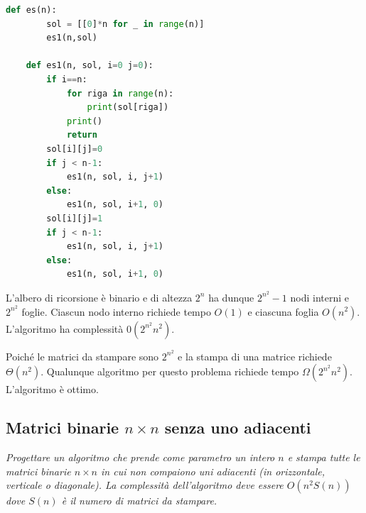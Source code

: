 \begin{lstlisting}[language=Python]
    def es(n):
        sol = [[0]*n for _ in range(n)]
        es1(n,sol)

    def es1(n, sol, i=0 j=0):
        if i==n:
            for riga in range(n):
                print(sol[riga])
            print()
            return
        sol[i][j]=0
        if j < n-1: 
            es1(n, sol, i, j+1)
        else: 
            es1(n, sol, i+1, 0)
        sol[i][j]=1
        if j < n-1:
            es1(n, sol, i, j+1)
        else:
            es1(n, sol, i+1, 0)
\end{lstlisting}
L'albero di ricorsione è binario e di altezza $2^n$ ha dunque $2^{n^2}-1$ nodi interni e $2^{n^2}$ foglie. Ciascun nodo interno richiede tempo $O(1)$ e ciascuna foglia $O(n^2)$. L'algoritmo ha complessità $0(2^{n^2}n^2)$.

Poiché le matrici da stampare sono $2^{n^2}$ e la stampa di una matrice richiede $\Theta(n^2)$. Qualunque algoritmo per questo problema richiede tempo $\Omega(2^{n^2}n^2)$. L'algoritmo è ottimo.


\subsection{Matrici binarie $n\times n$ senza uno adiacenti}
\textit{Progettare un algoritmo che prende come parametro un intero $n$ e stampa tutte le matrici binarie $n \times n$ in cui non compaiono uni adiacenti (in orizzontale, verticale o diagonale). La complessità dell'algoritmo deve essere $O(n^2S(n))$ dove $S(n)$ è il numero di matrici da stampare.}

